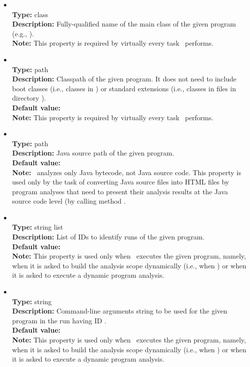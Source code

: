 \begin{itemize}
\item
{} \\
{\bf Type:} class \\
{\bf Description:} Fully-qualified name of the main class of the given program (e.g., ). \\
{\bf Note:} This property is required by virtually every task \Chord\ performs.

\item
{} \\
{\bf Type:} path \\
{\bf Description:} Classpath of the given program.  It does not need to include boot classes (i.e., classes in ) or standard extensions (i.e., classes in  files in directory ). \\
{\bf Default value:}  \\
{\bf Note:} This property is required by virtually every task \Chord\ performs.

\item
{} \\
{\bf Type:} path \\
{\bf Description:} Java source path of the given program. \\
{\bf Default value:}   \\
{\bf Note:} \Chord\ analyzes only Java bytecode, not Java source code.  This property is used only by the task of converting Java source files into HTML files by program analyses that need to present their analysis results at the Java source code level (by calling method .

\item
{} \\
{\bf Type:} string list \\
{\bf Description:} List of IDs to identify runs of the given program. \\
{\bf Default value:}  \\
{\bf Note:} This property is used only when \Chord\ executes the given program, namely, when it is asked to build the analysis scope dynamically (i.e., when ) or when it is asked to execute a dynamic program analysis.

\item
{} \\
{\bf Type:} string \\
{\bf Description:} Command-line arguments string to be used for the given program in the run having ID . \\
{\bf Default value:}  \\
{\bf Note:} This property is used only when \Chord\ executes the given program, namely, when it is asked to build the analysis scope dynamically (i.e., when ) or when it is asked to execute a dynamic program analysis.


\end{itemize}

